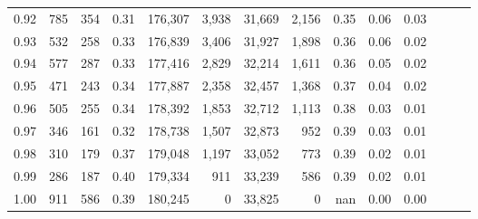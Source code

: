 \begin{tabular}{rrrrrrrrrrrrrr}
0.92 &    785 &  354 &  0.31 &  176,307 &    3,938 &  31,669 &   2,156 &  0.35 &  0.06 &      0.03 \\
0.93 &    532 &  258 &  0.33 &  176,839 &    3,406 &  31,927 &   1,898 &  0.36 &  0.06 &      0.02 \\
0.94 &    577 &  287 &  0.33 &  177,416 &    2,829 &  32,214 &   1,611 &  0.36 &  0.05 &      0.02 \\
0.95 &    471 &  243 &  0.34 &  177,887 &    2,358 &  32,457 &   1,368 &  0.37 &  0.04 &      0.02 \\
0.96 &    505 &  255 &  0.34 &  178,392 &    1,853 &  32,712 &   1,113 &  0.38 &  0.03 &      0.01 \\
0.97 &    346 &  161 &  0.32 &  178,738 &    1,507 &  32,873 &     952 &  0.39 &  0.03 &      0.01 \\
0.98 &    310 &  179 &  0.37 &  179,048 &    1,197 &  33,052 &     773 &  0.39 &  0.02 &      0.01 \\
0.99 &    286 &  187 &  0.40 &  179,334 &      911 &  33,239 &     586 &  0.39 &  0.02 &      0.01 \\
1.00 &    911 &  586 &  0.39 &  180,245 &        0 &  33,825 &       0 &   nan &  0.00 &      0.00 \\
\bottomrule
\end{tabular}
